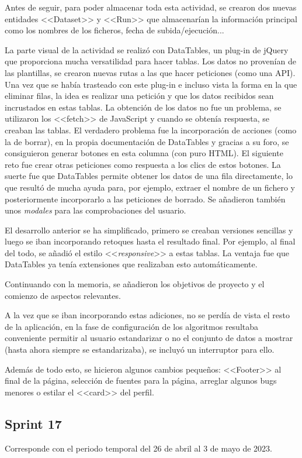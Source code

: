 Antes de seguir, para poder almacenar toda esta actividad, se crearon dos nuevas
entidades <<Dataset>> y <<Run>> que almacenarían la información principal como
los nombres de los ficheros, fecha de subida/ejecución...

La parte visual de la actividad se realizó con DataTables, un plug-in de jQuery
que proporciona mucha versatilidad para hacer tablas. Los datos no provenían de
las plantillas, se crearon nuevas rutas a las que hacer peticiones (como una
API). Una vez que se había trasteado con este plug-in e incluso vista la forma
en la que eliminar filas, la idea es realizar una petición y que los datos
recibidos sean incrustados en estas tablas. La obtención de los datos no fue un
problema, se utilizaron los <<fetch>> de JavaScript y cuando se obtenía
respuesta, se creaban las tablas. El verdadero problema fue la incorporación de
acciones (como la de borrar), en la propia documentación de DataTables y gracias
a su foro, se consiguieron generar botones en esta columna (con puro HTML). El
siguiente reto fue crear otras peticiones como respuesta a los clics de estos
botones. La suerte fue que DataTables permite obtener los datos de una fila
directamente, lo que resultó de mucha ayuda para, por ejemplo, extraer el nombre
de un fichero y posteriormente incorporarlo a las peticiones de borrado. Se
añadieron también unos \textit{modales} para las comprobaciones del usuario.

El desarrollo anterior se ha simplificado, primero se creaban versiones
sencillas y luego se iban incorporando retoques hasta el resultado final. Por
ejemplo, al final del todo, se añadió el estilo <<\textit{responsive}>> a estas
tablas. La ventaja fue que DataTables ya tenía extensiones que realizaban esto
automáticamente.

Continuando con la memoria, se añadieron los objetivos de proyecto y el comienzo
de aspectos relevantes.

A la vez que se iban incorporando estas adiciones, no se perdía de vista el
resto de la aplicación, en la fase de configuración de los algoritmos resultaba
conveniente permitir al usuario estandarizar o no el conjunto de datos a mostrar
(hasta ahora siempre se estandarizaba), se incluyó un interruptor para ello.

Además de todo esto, se hicieron algunos cambios pequeños: <<Footer>> al final
de la página, selección de fuentes para la página, arreglar algunos bugs menores
o estilar el <<card>> del perfil.

\subsection{Sprint 17}
Corresponde con el periodo temporal del 26 de abril al 3 de mayo de 2023.

